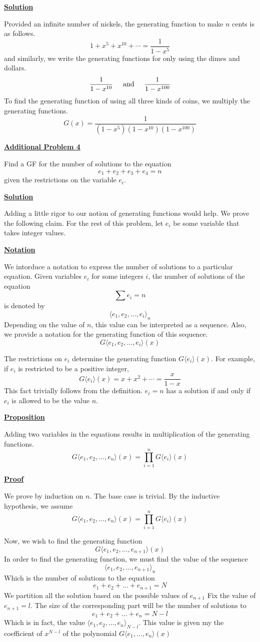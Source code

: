 \documentclass{article}
\newcommand{\new}[1]{
    \vspace{2mm}
    \noindent
    \textbf{
    \underline{#1}}
}
\newcommand{\textAnd}{
    {
        \hspace{5mm}
        \textrm{and}
        \hspace{5mm}
    }
}
\begin{document}
\new{Solution}
Provided an infinite number of nickels, the 
generating function to make $n$ cents is as follows. 
\[
    1 + x^5 + x^{10} + \cdots = \frac 1 {1 - x^5} 
\]
and similarly, we write the generating functions for 
only using the dimes and dollars. 
\[
    \frac 1{1 - x^{10}} \textAnd 
    \frac 1{1 - x^{100}}
\]
To find the generating function of using all three 
kinds of coins, we multiply the generating functions. 
\[
    \boxed{
        G(x) = 
        \frac 1 {
            (1 - x^5)
            (1 - x^{10}) 
            (1- x^{100})
        }
    }
\]

\new{Additional Problem 4} 
Find a GF for the number of solutions to the equation 
\[
    e_1 + e_2 + e_3 + e_4 = n
\]
given the restrictions on the variable $e_i$. 

\new{Solution}
Adding a little rigor to our notion of generating 
functions would help. We prove the following claim. 
For the rest of this problem, let $e_i$ be some 
variable that takes integer values. 

\new{Notation}
We intorduce a notation to express the number 
of solutions to a particular equation. Given 
variables $e_i$ for some integers $i$, the number 
of solutions of the equation 
\[
    \sum e_i = n
\]
is denoted by 
\[
    \langle
        e_1, e_2, \dots, e_i
    \rangle_n
\]
Depending on the value of $n$, this value can be 
interpreted as a sequence. 
Also, we provide a notation for the generating function 
of this sequence. 
\[
    G\langle
        e_1, e_2, \dots, e_i
    \rangle(x)
\]

The restrictions on $e_i$ determine the generating function 
$G\langle e_i \rangle(x)$. For example, if $e_i$ is 
restricted to be a positive integer, 
\[
    G\langle e_i\rangle(x) = x + x^2 + \cdots = 
    \frac x {1 - x}
\]
This fact trivially follows from the definition. $e_i = n$ 
has a solution if and only if $e_i$ is allowed to be the 
value $n$. 

\new{Proposition} 
Adding two variables in the equations results 
in multiplication of the generating functions. 
\[
    G\langle
        e_1, e_2, \dots, e_n
    \rangle(x)
    = 
    \prod_{i = 1}^n 
    G\langle e_i \rangle(x)
\]

\new{Proof}
We prove by induction on $n$. The base case is trivial. 
By the inductive hypothesis, we assume
\[
    G\langle
        e_1, e_2, \dots, e_n
    \rangle(x)
    = 
    \prod_{i = 1}^n 
    G\langle e_i \rangle(x)
\]

Now, we wish to find the generating function 
\[
    G\langle
        e_1, e_2, \dots, e_{n+ 1}
    \rangle(x)
\]
In order to find the generating function, we 
must find the value of the sequence 
\[
    \langle
        e_1, e_2, \dots, e_{n+ 1}
    \rangle_n
\]
Which is the number of solutions to the equation 
\[
     e_1 + e_2+ \dots+ e_{n+ 1} = N
\]
We partition all the solution based on the 
possible values of $e_{n + 1}$
Fix the value of $e_{n + 1} = l$. The size of the 
corresponding part will be the number of solutions 
to 
\[
     e_1 + e_2+ \dots+ e_n = N - l
\]
Which is in fact, the value 
$
    \langle 
        e_1, e_2 , \dots, e_n
    \rangle _{N - l}
$. This value is given my the coefficient of 
$x^{N - l}$ of the polynomial 
$G\langle e_1 , \dots, e_n \rangle(x)$
\end{document}

